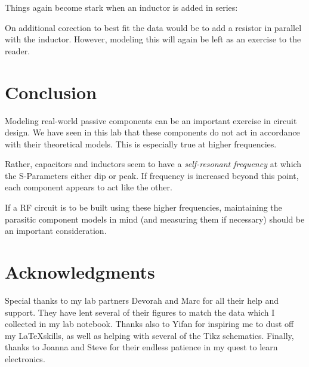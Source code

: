 \documentclass[lettersize,journal]{IEEEtran}
\begin{document}
Things again become stark when an inductor is added in series:

        \begin{center}
        \end{center}

On additional corection to best fit the data would be to add a resistor in parallel with the inductor. However, modeling this will again be left as an exercise to the reader.

\section{Conclusion}

Modeling real-world passive components can be an important exercise in circuit design. We have seen in this lab that these components do not act in accordance with their theoretical models. This is especially true at higher frequencies.

Rather, capacitors and inductors seem to have a {\it{self-resonant frequency}} at which the S-Parameters either dip or peak. If frequency is increased beyond this point, each component appears to act like the other.

If a RF circuit is to be built using these higher frequencies, maintaining the parasitic component models in mind (and measuring them if necessary) should be an important consideration.


\section*{Acknowledgments}
Special thanks to my lab partners Devorah and Marc for all their help and support. They have lent several of their figures to match the data which I collected in my lab notebook. Thanks also to Yifan for inspiring me to dust off my \LaTeX skills, as well as helping with several of the Tikz schematics. Finally, thanks to Joanna and Steve for their endless patience in my quest to learn electronics.



% 


\end{document}
